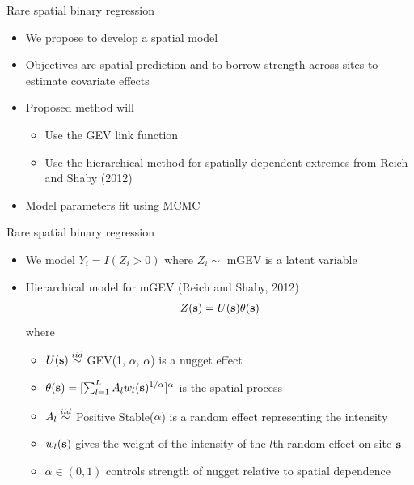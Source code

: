 \documentclass{beamer}
\begin{document}
\begin{frame}{Rare spatial binary regression}
  \begin{itemize} \setlength{\itemsep}{1em}
    \item We propose to develop a spatial model
    \item Objectives are spatial prediction and to borrow strength across sites to estimate covariate effects
    \item Proposed method will \vspace{0.5em}
    \begin{itemize} \setlength{\itemsep}{0.5em}
      \item Use the GEV link function
      \item Use the hierarchical method for spatially dependent extremes from Reich and Shaby (2012)
    \end{itemize}
    \item Model parameters fit using MCMC
  \end{itemize}
\end{frame}

\begin{frame}{Rare spatial binary regression}
  \begin{itemize} \setlength{\itemsep}{1em}
    \item We model $Y_i = I(Z_i > 0)$ where $Z_i\sim$ mGEV is a latent variable
    \item Hierarchical model for mGEV (Reich and Shaby, 2012)
    \begin{align*}
      Z(\mbox{\bf s}) = U(\mbox{\bf s}) \theta(\mbox{\bf s})
    \end{align*}
    where
    \begin{itemize} \setlength{\itemsep}{0.25em}
      \item $U(\mbox{\bf s}) \stackrel{iid}{\sim}$ GEV(1, $\alpha$, $\alpha$) is a nugget effect
      \item $\theta(\mbox{\bf s}) = [\sum_{l = 1}^L A_l w_l(\mbox{\bf s})^{1/\alpha}]^\alpha$ is the spatial process
      \item $A_l \stackrel{iid}{\sim}$ Positive Stable($\alpha$) is a random effect representing the intensity
      \item $w_l(\mbox{\bf s})$ gives the weight of the intensity of the $l$th random effect on site $\mbox{\bf s}$
      \item $\alpha \in (0, 1)$ controls strength of nugget relative to spatial dependence
    \end{itemize}
  \end{itemize}
\end{frame}
\end{document}
